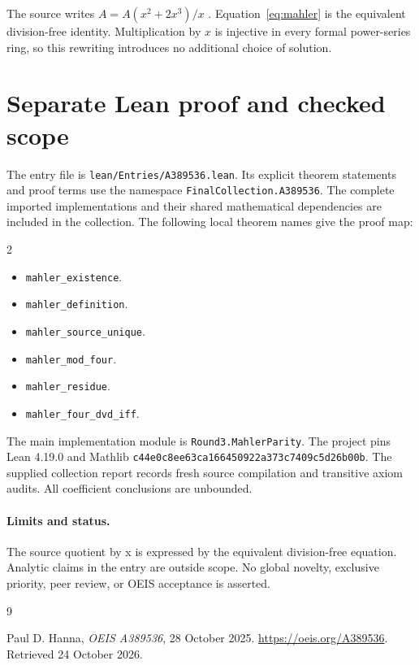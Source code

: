 \documentclass[11pt,a4paper]{article}
\theoremstyle{remark}
\begin{document}
The source writes $A=A(x^2+2x^3)/x$ \cite{oeis536}.
Equation~\eqref{eq:mahler} is the equivalent division-free identity.
Multiplication by $x$ is injective in every formal power-series ring,
so this rewriting introduces no additional choice of solution.


\section{Separate Lean proof and checked scope}

The entry file is \nolinkurl{lean/Entries/A389536.lean}. Its explicit
theorem statements and proof terms use the namespace
\nolinkurl{FinalCollection.A389536}. The complete imported implementations
and their shared mathematical dependencies are included in the collection.
The following local theorem names give the proof map:

\begin{multicols}{2}\raggedright\begin{itemize}\setlength{\itemsep}{2pt}\setlength{\parsep}{0pt}
\item \nolinkurl{mahler_existence}.
\item \nolinkurl{mahler_definition}.
\item \nolinkurl{mahler_source_unique}.
\item \nolinkurl{mahler_mod_four}.
\item \nolinkurl{mahler_residue}.
\item \nolinkurl{mahler_four_dvd_iff}.
\end{itemize}\end{multicols}

The main implementation module is \nolinkurl{Round3.MahlerParity}.
The project pins Lean 4.19.0 and Mathlib
\nolinkurl{c44e0c8ee63ca166450922a373c7409c5d26b00b}.
The supplied collection report records fresh source compilation and
transitive axiom audits. All coefficient conclusions are unbounded.

\paragraph{Limits and status.}
The source quotient by x is expressed by the equivalent division-free equation. Analytic claims in the entry are outside scope.
No global novelty, exclusive priority, peer review, or OEIS acceptance is asserted.

\begin{thebibliography}{9}
\raggedright
{}
Paul D. Hanna, \emph{OEIS A389536}, 28 October 2025.
\url{https://oeis.org/A389536}. Retrieved 24 October 2026.
\end{thebibliography}
\end{document}
